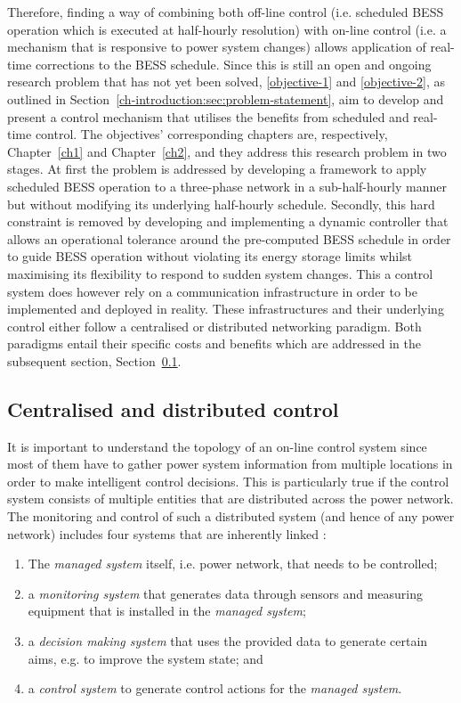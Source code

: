 Therefore, finding a way of combining both off-line control (i.e. scheduled BESS operation which is executed at half-hourly resolution) with on-line control (i.e. a mechanism that is responsive to power system changes) allows application of real-time corrections to the BESS schedule.
Since this is still an open and ongoing research problem that has not yet been solved, \ref{objective-1} and \ref{objective-2}, as outlined in Section~\ref{ch-introduction:sec:problem-statement}, aim to develop and present a control mechanism that utilises the benefits from scheduled and real-time control.
The objectives' corresponding chapters are, respectively, Chapter~\ref{ch1} and Chapter~\ref{ch2}, and they address this research problem in two stages.
At first the problem is addressed by developing a framework to apply scheduled BESS operation to a three-phase network in a sub-half-hourly manner but without modifying its underlying half-hourly schedule.
Secondly, this hard constraint is removed by developing and implementing a dynamic controller that allows an operational tolerance around the pre-computed BESS schedule in order to guide BESS operation without violating its energy storage limits whilst maximising its flexibility to respond to sudden system changes.
This a control system does however rely on a communication infrastructure in order to be implemented and deployed in reality.
These infrastructures and their underlying control either follow a centralised or distributed networking paradigm.
Both paradigms entail their specific costs and benefits which are addressed in the subsequent section, Section~\ref{ch-literature:subsec:centralised-and-distributed-control}.

\subsection{Centralised and distributed control}
\label{ch-literature:subsec:centralised-and-distributed-control}

It is important to understand the topology of an on-line control system since most of them have to gather power system information from multiple locations in order to make intelligent control decisions.
This is particularly true if the control system consists of multiple entities that are distributed across the power network.
The monitoring and control of such a distributed system (and hence of any power network) includes four systems that are inherently linked \cite{Mansouri-Samani1993}:

\begin{enumerate}
	\item The \textit{managed system} itself, i.e. power network, that needs to be controlled;
	\item a \textit{monitoring system} that generates data through sensors and measuring equipment that is installed in the \textit{managed system};
	\item a \textit{decision making system} that uses the provided data to generate certain aims, e.g. to improve the system state; and
	\item a \textit{control system} to generate control actions for the \textit{managed system}.
\end{enumerate}

